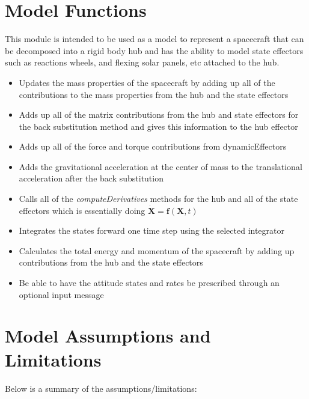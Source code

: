 \section{Model Functions}

This module is intended to be used as a model to represent a spacecraft that can be decomposed into a rigid body hub and has the ability to model state effectors such as reactions wheels, and flexing solar panels, etc attached to the hub.

\begin{itemize}
	\item Updates the mass properties of the spacecraft by adding up all of the contributions to the mass properties from the hub and the state effectors
	\item Adds up all of the matrix contributions from the hub and state effectors for the back substitution method and gives this information to the hub effector
	\item Adds up all of the force and torque contributions from dynamicEffectors
	\item Adds the gravitational acceleration at the center of mass to the translational acceleration after the back substitution
	\item Calls all of the \textit{computeDerivatives} methods for the hub and all of the state effectors which is essentially doing $\dot{\bm X} = \bm f(\bm X, t)$
	\item Integrates the states forward one time step using the selected integrator
	\item Calculates the total energy and momentum of the spacecraft by adding up contributions from the hub and the state effectors
	\item Be able to have the attitude states and rates be prescribed through an optional input message
\end{itemize}

\section{Model Assumptions and Limitations}
Below is a summary of the assumptions/limitations:

